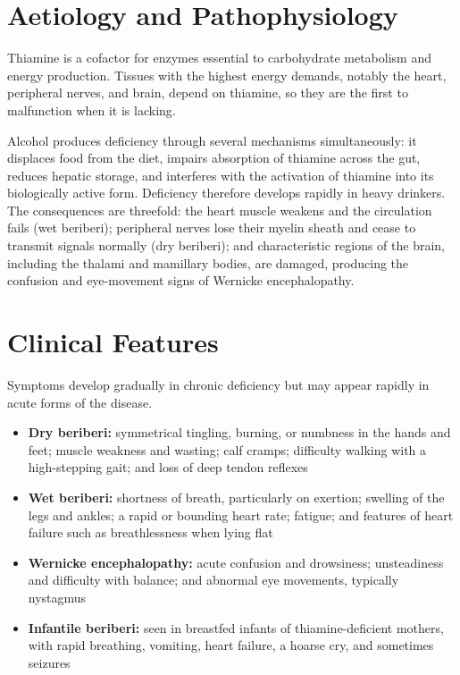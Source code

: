 \section*{Aetiology and Pathophysiology}
Thiamine is a cofactor for enzymes essential to carbohydrate metabolism and energy production. Tissues with the highest energy demands, notably the heart, peripheral nerves, and brain, depend on thiamine, so they are the first to malfunction when it is lacking.

Alcohol produces deficiency through several mechanisms simultaneously: it displaces food from the diet, impairs absorption of thiamine across the gut, reduces hepatic storage, and interferes with the activation of thiamine into its biologically active form. Deficiency therefore develops rapidly in heavy drinkers. The consequences are threefold: the heart muscle weakens and the circulation fails (wet beriberi); peripheral nerves lose their myelin sheath and cease to transmit signals normally (dry beriberi); and characteristic regions of the brain, including the thalami and mamillary bodies, are damaged, producing the confusion and eye-movement signs of Wernicke encephalopathy.

\section*{Clinical Features}
Symptoms develop gradually in chronic deficiency but may appear rapidly in acute forms of the disease.

\begin{itemize}
    \item \textbf{Dry beriberi:} symmetrical tingling, burning, or numbness in the hands and feet; muscle weakness and wasting; calf cramps; difficulty walking with a high-stepping gait; and loss of deep tendon reflexes
    \item \textbf{Wet beriberi:} shortness of breath, particularly on exertion; swelling of the legs and ankles; a rapid or bounding heart rate; fatigue; and features of heart failure such as breathlessness when lying flat
    \item \textbf{Wernicke encephalopathy:} acute confusion and drowsiness; unsteadiness and difficulty with balance; and abnormal eye movements, typically nystagmus
    \item \textbf{Infantile beriberi:} seen in breastfed infants of thiamine-deficient mothers, with rapid breathing, vomiting, heart failure, a hoarse cry, and sometimes seizures
\end{itemize}

